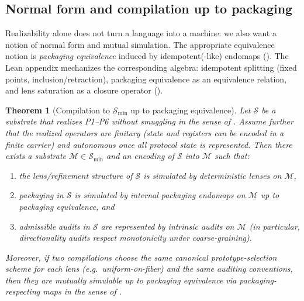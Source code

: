 \documentclass[11pt]{article}
\newtheorem{theorem}{Theorem}[section]
\theoremstyle{definition}
\theoremstyle{remark}
\begin{document}
\subsection{Normal form and compilation up to packaging}

Realizability alone does not turn a language into a machine: we also want a notion of normal form and mutual simulation.
The appropriate equivalence notion is \emph{packaging equivalence} induced by idempotent(-like) endomaps ().
The Lean appendix mechanizes the corresponding algebra: idempotent splitting (fixed points, inclusion/retraction), packaging equivalence as an equivalence relation, and lens saturation as a closure operator ().

\begin{theorem}[Compilation to $\mathcal S_{\min}$ up to packaging equivalence]
\label{thm:normal-form}
Let $\mathcal S$ be a substrate that realizes P1--P6 without smuggling in the sense of .
Assume further that the realized operators are finitary (state and registers can be encoded in a finite carrier) and autonomous once all protocol state is represented.
Then there exists a substrate $\mathcal M\in\mathcal S_{\min}$ and an encoding of $\mathcal S$ into $\mathcal M$ such that:
\begin{enumerate}[leftmargin=*, itemsep=0.25em]
  \item the lens/refinement structure of $\mathcal S$ is simulated by deterministic lenses on $\mathcal M$,
  \item packaging in $\mathcal S$ is simulated by internal packaging endomaps on $\mathcal M$ up to packaging equivalence, and
  \item admissible audits in $\mathcal S$ are represented by intrinsic audits on $\mathcal M$ (in particular, directionality audits respect monotonicity under coarse-graining).
\end{enumerate}
Moreover, if two compilations choose the same canonical prototype-selection scheme for each lens (e.g.\ uniform-on-fiber) and the same auditing conventions, then they are mutually simulable up to packaging equivalence via packaging-respecting maps in the sense of .
\end{theorem}
\end{document}
